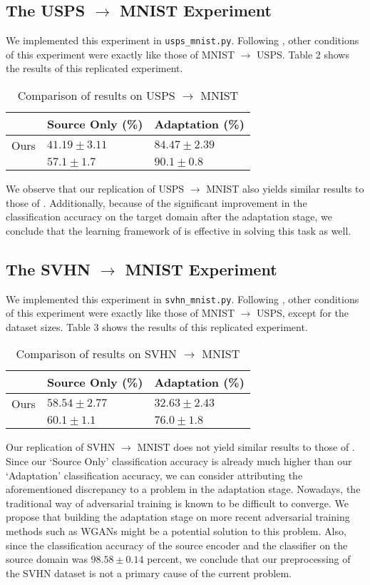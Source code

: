 \documentclass[14pt]{extarticle}
\begin{document}
		\subsection{The USPS $\rightarrow$ MNIST Experiment}
		We implemented this experiment in \texttt{usps\_mnist.py}. Following \cite{adda}, other conditions of this experiment were exactly like those of MNIST $\rightarrow$ USPS. Table 2 shows the results of this replicated experiment.
		\begin{table}[H]
			\centering
			\begin{tabular}{|P{40mm}|P{40mm}|P{40mm}|}
				\hline
				 & Source Only (\%) & Adaptation (\%)\\
				\hline
				Ours & $41.19 \pm 3.11$ & $84.47 \pm 2.39$\\
				\hline
				\cite{adda} & $57.1 \pm 1.7$ & $90.1 \pm 0.8$\\
				\hline
			\end{tabular}
			\caption{Comparison of results on USPS $\rightarrow$ MNIST}
		\end{table}
		We observe that our replication of USPS $\rightarrow$ MNIST also yields similar results to those of \cite{adda}. Additionally, because of the significant improvement in the classification accuracy on the target domain after the adaptation stage, we conclude that the learning framework of \cite{adda} is effective in solving this task as well.
		\subsection{The SVHN $\rightarrow$ MNIST Experiment}
		We implemented this experiment in \texttt{svhn\_mnist.py}. Following \cite{adda}, other conditions of this experiment were exactly like those of MNIST $\rightarrow$ USPS, except for the dataset sizes. Table 3 shows the results of this replicated experiment.
		\begin{table}[H]
			\centering
			\begin{tabular}{|P{40mm}|P{40mm}|P{40mm}|}
				\hline
				 & Source Only (\%) & Adaptation (\%)\\
				\hline
				Ours & $58.54 \pm 2.77$ & $32.63 \pm 2.43$\\
				\hline
				\cite{adda} & $60.1 \pm 1.1$ & $76.0 \pm 1.8$\\
				\hline
			\end{tabular}
			\caption{Comparison of results on SVHN $\rightarrow$ MNIST}
		\end{table}
		Our replication of SVHN $\rightarrow$ MNIST does not yield similar results to those of \cite{adda}. Since our `Source Only' classification accuracy is already much higher than our `Adaptation' classification accuracy, we can consider attributing the aforementioned discrepancy to a problem in the adaptation stage. Nowadays, the traditional way of adversarial training is known to be difficult to converge. We propose that building the adaptation stage on more recent adversarial training methods such as WGANs \cite{wgan} might be a potential solution to this problem. Also, since the classification accuracy of the source encoder and the classifier on the source domain was $98.58 \pm 0.14$ percent, we conclude that our preprocessing of the SVHN dataset is not a primary cause of the current problem.
\end{document}
